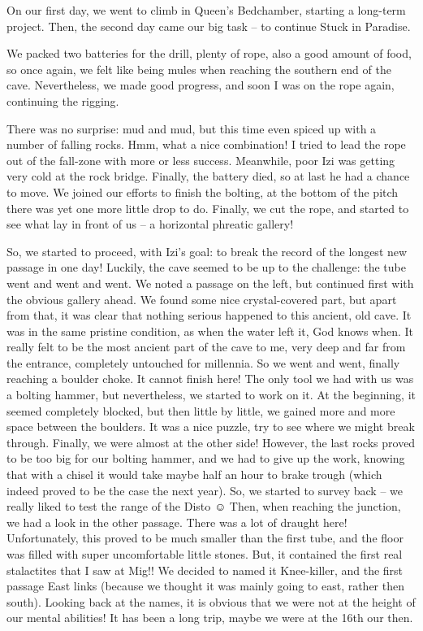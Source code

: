 On our first day, we went to climb in Queen's Bedchamber, starting a
long-term project. Then, the second day came our big task -- to continue
Stuck in Paradise.

We packed two batteries for the drill, plenty of rope, also a good
amount of food, so once again, we felt like being mules when reaching
the southern end of the cave. Nevertheless, we made good progress, and
soon I was on the rope again, continuing the rigging.

There was no surprise: mud and mud, but this time even spiced up with a
number of falling rocks. Hmm, what a nice combination! I tried to lead
the rope out of the fall-zone with more or less success. Meanwhile, poor
Izi was getting very cold at the rock bridge. Finally, the battery died,
so at last he had a chance to move. We joined our efforts to finish the
bolting, at the bottom of the pitch there was yet one more little drop
to do. Finally, we cut the rope, and started to see what lay in front of
us -- a horizontal phreatic gallery!

So, we started to proceed, with Izi's goal: to break the record of the
longest new passage in one day! Luckily, the cave seemed to be up to the
challenge: the tube went and went and went. We noted a passage on the
left, but continued first with the obvious gallery ahead. We found some
nice crystal-covered part, but apart from that, it was clear that
nothing serious happened to this ancient, old cave. It was in the same
pristine condition, as when the water left it, God knows when. It really
felt to be the most ancient part of the cave to me, very deep and far
from the entrance, completely untouched for millennia. So we went and
went, finally reaching a boulder choke. It cannot finish here! The only
tool we had with us was a bolting hammer, but nevertheless, we started
to work on it. At the beginning, it seemed completely blocked, but then
little by little, we gained more and more space between the boulders. It
was a nice puzzle, try to see where we might break through. Finally, we
were almost at the other side! However, the last rocks proved to be too
big for our bolting hammer, and we had to give up the work, knowing that
with a chisel it would take maybe half an hour to brake trough (which
indeed proved to be the case the next year). So, we started to survey
back -- we really liked to test the range of the Disto ☺ Then, when
reaching the junction, we had a look in the other passage. There was a
lot of draught here! Unfortunately, this proved to be much smaller than
the first tube, and the floor was filled with super uncomfortable little
stones. But, it contained the first real stalactites that I saw at Mig!!
We decided to named it Knee-killer, and the first passage East links
(because we thought it was mainly going to east, rather then south).
Looking back at the names, it is obvious that we were not at the height
of our mental abilities! It has been a long trip, maybe we were at the
16th our then.

